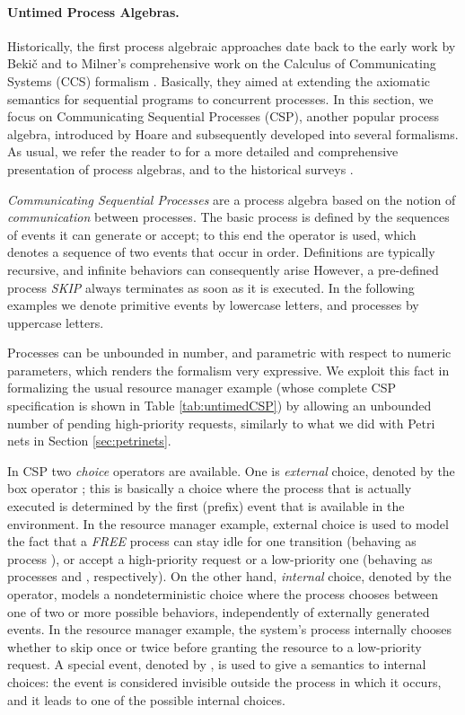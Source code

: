 \paragraph{Untimed Process Algebras.}
Historically, the first process algebraic approaches date back 
to the early work by Beki{\v c} \cite{Bek71} and to Milner's comprehensive 
work on the Calculus of Communicating Systems (CCS) formalism \cite{Mil80,Mil89}.
Basically, they aimed at extending the axiomatic 
semantics for sequential programs to concurrent processes. In 
this section, we focus on Communicating Sequential Processes 
(CSP), another popular process algebra, introduced by Hoare \cite{Hoa78,Hoa85} 
and subsequently developed into several formalisms. As usual, 
we refer the reader to \cite{BPS01} for a more detailed and comprehensive 
presentation of process algebras, and to the historical surveys \cite{Bae04,Bae03}.

\emph{Communicating Sequential Processes} are a process algebra 
based on the notion of \emph{communication} between processes. The 
basic process is defined by the sequences of events it can generate 
or accept; to this end the  operator is used, which denotes a 
sequence of two events that occur in order. Definitions are typically 
recursive, and infinite behaviors can consequently arise
However, a pre-defined process \textsl{SKIP} always terminates as soon as it
is executed. In the following examples we denote primitive events 
by lowercase letters, and processes by uppercase letters.

Processes can be unbounded in number, and parametric with respect 
to numeric parameters, which renders the formalism very expressive. 
We exploit this fact in formalizing the usual resource manager 
example (whose complete CSP specification is shown in Table \ref{tab:untimedCSP}) 
by allowing an unbounded number of pending high-priority requests, 
similarly to what we did with Petri nets in Section \ref{sec:petrinets}.

In CSP two \emph{choice} operators are available. One is \emph{external} 
choice, denoted by the box operator ; this is basically a 
choice where the process that is actually executed is determined 
by the first (prefix) event that is available in the environment. 
In the resource manager example, external choice is used to model 
the fact that a \textsl{FREE} process can stay idle for one transition 
(behaving as process ), or accept a high-priority request or 
a low-priority one (behaving as processes  and , respectively). 
On the other hand, \emph{internal} choice, denoted by the  operator, 
models a nondeterministic choice where the process chooses between 
one of two or more possible behaviors, independently of externally 
generated events. In the resource manager example, the system's 
process  internally chooses whether to skip once or twice 
before granting the resource to a low-priority request. A special 
event, denoted by , is used to give a semantics to internal 
choices: the  event is considered invisible outside 
the process in which it occurs, and it leads to one of the possible 
internal choices.

